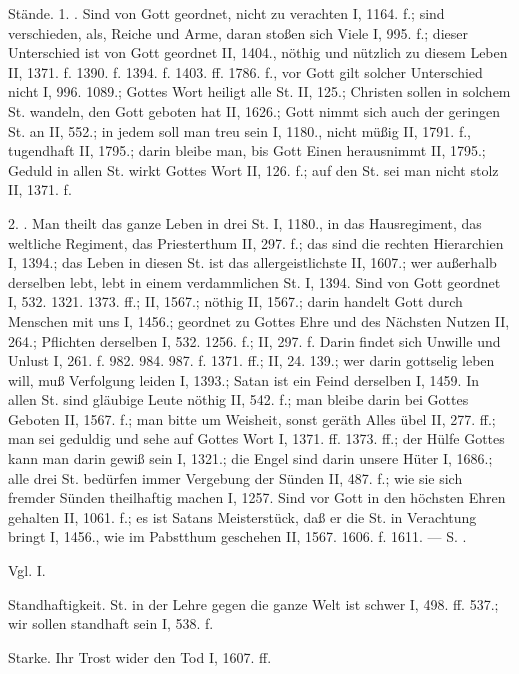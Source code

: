 Stände. 1. . Sind von Gott geordnet, nicht zu verachten I, 1164. f.; sind verschieden, als, Reiche und Arme, daran stoßen sich Viele I, 995. f.; dieser Unterschied ist von Gott geordnet II, 1404., nöthig und nützlich zu diesem Leben II, 1371. f. 1390. f. 1394. f. 1403. ff. 1786. f., vor Gott gilt solcher Unterschied nicht I, 996. 1089.; Gottes Wort heiligt alle St. II, 125.; Christen sollen in solchem St. wandeln, den Gott geboten hat II, 1626.; Gott nimmt sich auch der geringen St.
an II, 552.; in jedem soll man treu sein I, 1180., nicht müßig II, 1791. f., tugendhaft II, 1795.; darin bleibe man, bis Gott Einen herausnimmt II, 1795.; Geduld in allen St. wirkt Gottes Wort II, 126. f.; auf den St. sei man nicht stolz II, 1371. f.

2. . Man theilt das ganze Leben in drei St. I, 1180., in das Hausregiment, das weltliche Regiment, das Priesterthum II, 297. f.; das sind die rechten Hierarchien I, 1394.; das Leben in diesen St. ist das allergeistlichste II, 1607.; wer außerhalb derselben lebt, lebt in einem verdammlichen St. I, 1394. Sind von Gott geordnet I, 532. 1321. 1373. ff.; II, 1567.; nöthig II, 1567.; darin handelt Gott durch Menschen mit uns I, 1456.; geordnet zu Gottes Ehre und des Nächsten Nutzen II, 264.; Pflichten derselben I, 532. 1256. f.; II, 297. f. Darin findet sich Unwille und Unlust I, 261. f. 982. 984. 987. f. 1371. ff.; II, 24. 139.; wer darin gottselig leben will, muß Verfolgung leiden I, 1393.; Satan ist ein Feind derselben I, 1459. In allen St. sind gläubige Leute nöthig II, 542. f.; man bleibe darin bei Gottes Geboten II, 1567. f.; man bitte um Weisheit, sonst geräth Alles übel II, 277. ff.; man sei geduldig und sehe auf Gottes Wort I, 1371. ff. 1373. ff.; der Hülfe Gottes kann man darin gewiß sein I, 1321.; die Engel sind darin unsere Hüter I, 1686.; alle drei St. bedürfen immer Vergebung der Sünden II, 487. f.; wie sie sich fremder Sünden theilhaftig machen I, 1257. Sind vor Gott in den höchsten Ehren gehalten II, 1061. f.; es ist Satans Meisterstück, daß er die St. in Verachtung bringt I, 1456., wie im Pabstthum geschehen II, 1567. 1606. f. 1611. — S. .

Vgl.  I.

Standhaftigkeit. St. in der Lehre gegen die ganze Welt ist schwer I, 498. ff. 537.; wir sollen standhaft sein I, 538. f.

Starke. Ihr Trost wider den Tod I, 1607. ff.

